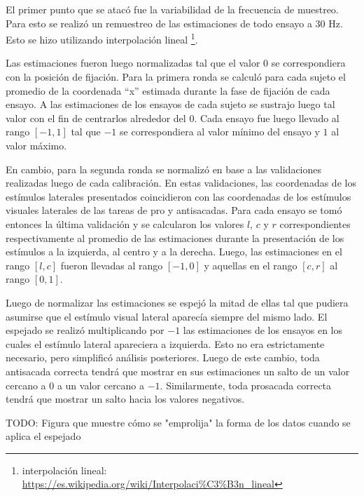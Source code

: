   El primer punto que se atacó fue la variabilidad de la frecuencia de
  muestreo.
  Para esto se realizó un remuestreo de las estimaciones de todo ensayo a 30
  Hz.
  Esto se hizo utilizando interpolación lineal \footnote{
    interpolación lineal:
    \url{https://es.wikipedia.org/wiki/Interpolaci\%C3\%B3n\_lineal}
  }.

  Las estimaciones fueron luego normalizadas tal que el valor $0$ se
  correspondiera con la posición de fijación.
  Para la primera ronda se calculó para cada sujeto el promedio de la
  coordenada ``x'' estimada durante la fase de fijación de cada ensayo.
  A las estimaciones de los ensayos de cada sujeto se sustrajo luego tal valor
  con el fin de centrarlos alrededor del $0$.
  Cada ensayo fue luego llevado al rango $[-1, 1]$ tal que $-1$ se
  correspondiera al valor mínimo del ensayo y $1$ al valor máximo.

  En cambio, para la segunda ronda se normalizó en base a las validaciones
  realizadas luego de cada calibración.
  En estas validaciones, las coordenadas de los estímulos laterales presentados
  coincidieron con las coordenadas de los estímulos visuales laterales de las
  tareas de pro y antisacadas.
  Para cada ensayo se tomó entonces la última validación y se calcularon los
  valores $l$, $c$ y $r$ correspondientes respectivamente al promedio de las
  estimaciones durante la presentación de los estímulos a la izquierda, al
  centro y a la derecha.
  Luego, las estimaciones en el rango $[l, c]$ fueron llevadas al rango $[-1,
  0]$ y aquellas en el rango $[c, r]$ al rango $[0, 1]$.

  Luego de normalizar las estimaciones se espejó la mitad de ellas tal que
  pudiera asumirse que el estímulo visual lateral aparecía siempre del mismo
  lado.
  El espejado se realizó multiplicando por $-1$ las estimaciones de los ensayos
  en los cuales el estímulo lateral apareciera a izquierda.
  Esto no era estrictamente necesario, pero simplificó análisis posteriores.
  Luego de este cambio, toda antisacada correcta tendrá que mostrar en sus
  estimaciones un salto de un valor cercano a $0$ a un valor cercano a $-1$.
  Similarmente, toda prosacada correcta tendrá que mostrar un salto hacia los
  valores negativos.

  TODO: Figura que muestre cómo se "emprolija" la forma de los datos cuando se
        aplica el espejado

